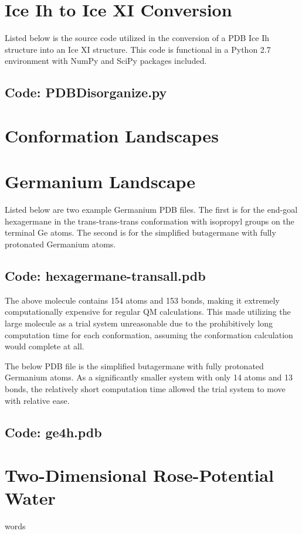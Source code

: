 \chapter{Ice Ih to Ice XI Conversion}
\label{ch:App:CrystalDisorg}

Listed below is the source code utilized in the conversion of a PDB Ice Ih structure into an Ice XI structure. This code is functional in a Python 2.7 environment with NumPy and SciPy packages included.

\section{Code: PDBDisorganize.py}


\chapter{Conformation Landscapes}
\label{ch:App:ConfLand}


\chapter{Germanium Landscape}
\label{ch:App:GermLand}

Listed below are two example Germanium PDB files. The first is for the end-goal hexagermane in the trans-trans-trans conformation with isopropyl groups on the terminal Ge atoms. The second is for the simplified butagermane with fully protonated Germanium atoms.

\section{Code: hexagermane-transall.pdb}


The above molecule contains 154 atoms and 153 bonds, making it extremely computationally expensive for regular QM calculations. This made utilizing the large molecule as a trial system unreasonable due to the prohibitively long computation time for each conformation, assuming the conformation calculation would complete at all.

The below PDB file is the simplified butagermane with fully protonated Germanium atoms. As a significantly smaller system with only 14 atoms and 13 bonds, the relatively short computation time allowed the trial system to move with relative ease.

\section{Code: ge4h.pdb}


\chapter{Two-Dimensional Rose-Potential Water}

words


